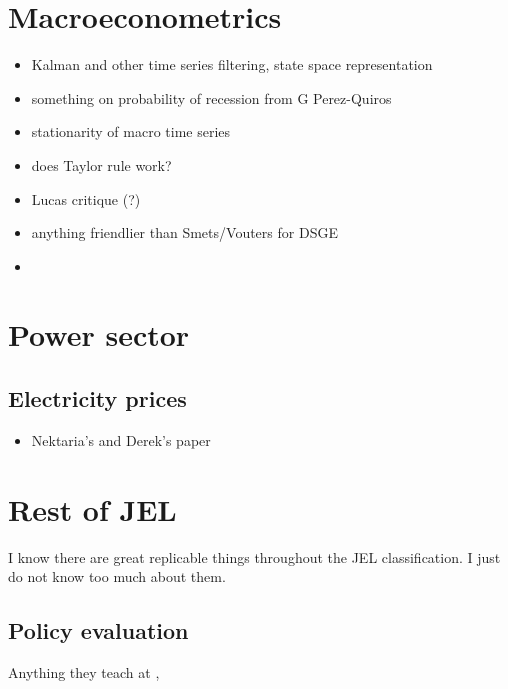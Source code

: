 \documentclass[letterpaper,10pt,english]{sphinxmanual}
\begin{document}
\section{Macroeconometrics}
\label{\detokenize{applications:macroeconometrics}}\begin{itemize}
\item {} 
Kalman and other time series filtering, state space representation

\item {} 
something on probability of recession from G Perez-Quiros

\item {} 
stationarity of macro time series

\item {} 
does Taylor rule work?

\item {} 
Lucas critique (?)

\item {} 
anything friendlier than Smets/Vouters for DSGE

\item {} 

\end{itemize}


\section{Power sector}
\label{\detokenize{applications:power-sector}}

\subsection{Electricity prices}
\label{\detokenize{applications:electricity-prices}}\begin{itemize}
\item {} 
Nektaria’s and Derek’s paper

\end{itemize}


\section{Rest of JEL}
\label{\detokenize{applications:rest-of-jel}}
I know there are great replicable things throughout the JEL classification. I just do not know too much about them.


\subsection{Policy evaluation}
\label{\detokenize{applications:policy-evaluation}}
Anything they teach at , 
\end{document}
